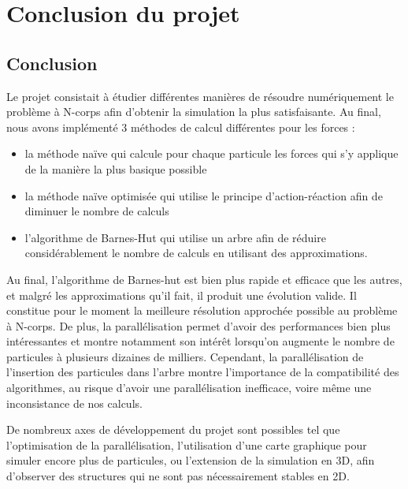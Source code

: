\chapter{Conclusion du projet}

\section{Conclusion}

Le projet consistait à étudier différentes manières de résoudre numériquement le problème à N-corps afin d'obtenir la simulation la plus satisfaisante. Au final, nous avons implémenté $3$ méthodes de calcul différentes pour les forces :

\begin{itemize}
\item la méthode naïve qui calcule pour chaque particule les forces qui s'y applique de la manière la plus basique possible

\item la méthode naïve optimisée qui utilise le principe d'action-réaction afin de diminuer le nombre de calculs

\item l'algorithme de Barnes-Hut qui utilise un arbre afin de réduire considérablement le nombre de calculs en utilisant des approximations.

\end{itemize}

\vspace{2mm}
Au final, l'algorithme de Barnes-hut est bien plus rapide et efficace que les autres, et malgré les approximations qu'il fait, il produit une évolution valide. Il constitue pour le moment la meilleure résolution approchée possible au problème à N-corps. De plus, la parallélisation permet d'avoir des performances bien plus intéressantes et montre notamment son intérêt lorsqu'on augmente le nombre de particules à plusieurs dizaines de milliers. Cependant, la parallélisation de l'insertion des particules dans l'arbre montre l'importance de la compatibilité des algorithmes, au risque d'avoir une parallélisation inefficace, voire même une inconsistance de nos calculs.

\vspace{2mm}
De nombreux axes de développement du projet sont possibles tel que l'optimisation de la parallélisation, l'utilisation d'une carte graphique pour simuler encore plus de particules, ou l'extension de la simulation en 3D, afin d'observer des structures qui ne sont pas nécessairement stables en 2D.

